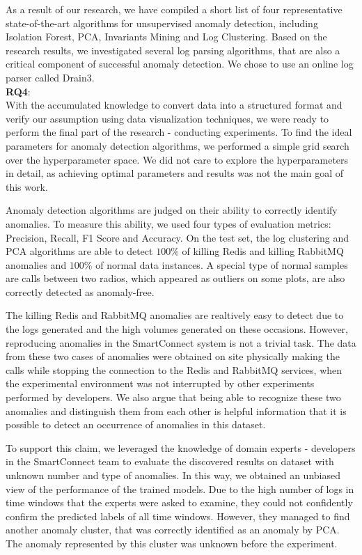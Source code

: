 As a result of our research, we have compiled a short list of four representative state-of-the-art algorithms for unsupervised anomaly detection, including Isolation Forest, PCA, Invariants Mining and Log Clustering. Based on the research results, we investigated several log parsing algorithms, that are also a critical component of successful anomaly detection. We chose to use an online log parser called Drain3.\\

\textbf{RQ4}: \textit{\RQFourth}\\

With the accumulated knowledge to convert data into a structured format and verify our assumption using data visualization techniques, we were ready to perform the final part of the research - conducting experiments. To find the ideal parameters for anomaly detection algorithms, we performed a simple grid search over the hyperparameter space. We did not care to explore the hyperparameters in detail, as achieving optimal parameters and results was not the main goal of this work. 

Anomaly detection algorithms are judged on their ability to correctly identify anomalies. To measure this ability, we used four types of evaluation metrics: Precision, Recall, F1 Score and Accuracy. On the test set, the log clustering and PCA algorithms are able to detect $100 \%$ of killing Redis and killing RabbitMQ anomalies and $100 \%$ of normal data instances. A special type of normal samples are calls between two radios, which appeared as outliers on some plots, are also correctly detected as anomaly-free. 

The killing Redis and RabbitMQ anomalies are realtively easy to detect due to the logs generated and the high volumes generated on these occasions. However, reproducing anomalies in the SmartConnect system is not a trivial task. The data from these two cases of anomalies were obtained on site physically making the calls while stopping the connection to the Redis and RabbitMQ services, when the experimental environment was not interrupted by other experiments performed by developers. 
We also argue that being able to recognize these two anomalies and distinguish them from each other is helpful information that it is possible to detect an occurrence of anomalies in this dataset. 

To support this claim, we leveraged the knowledge of domain experts - developers in the SmartConnect team to evaluate the discovered results on dataset with unknown number and type of anomalies. In this way, we obtained an unbiased view of the performance of the trained models. Due to the high number of logs in time windows that the experts were asked to examine, they could not confidently confirm the predicted labels of all time windows. However, they managed to find another anomaly cluster, that was correctly identified as an anomaly by PCA. The anomaly represented by this cluster was unknown before the experiment.

